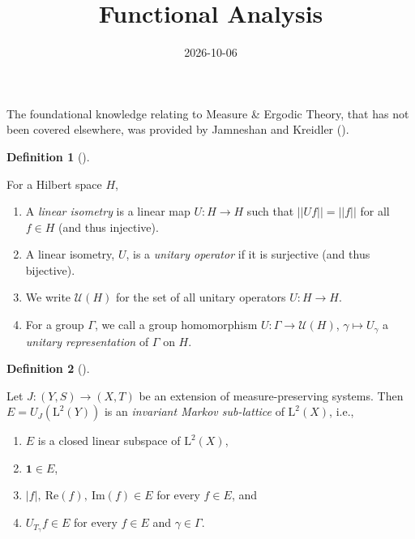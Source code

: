 \documentclass[
  british,
]{article}
\title{Functional Analysis}
\author{}
\date{2026-10-06}
\providecommand{\tightlist}{%
  \setlength{\itemsep}{0pt}\setlength{\parskip}{0pt}}
\theoremstyle{definition}
\theoremstyle{definition}
\newtheorem{definition}{Definition}[section]
\theoremstyle{plain}
\theoremstyle{remark}
\newcommand{\Group}{{\Gamma}}
\newcommand{\GroupElement}{{\gamma}}
\newcommand{\HilbertSpace}{{H}}
\begin{document}
\maketitle


The foundational knowledge relating to Measure \& Ergodic Theory, that
has not been covered elsewhere, was provided by Jamneshan and Kreidler
().

\begin{definition}[]\protect\hypertarget{def-Representation}{}\label{def-Representation}

For a Hilbert space \(\HilbertSpace\),

\begin{enumerate}
\def\labelenumi{\arabic{enumi}.}
\tightlist
\item
  A \emph{linear isometry} is a linear map
  \(U:\HilbertSpace \rightarrow \HilbertSpace\) such that
  \(||Uf||=||f||\) for all \(f\in \HilbertSpace\) (and thus injective).
\item
  A linear isometry, \(U\), is a \emph{unitary operator} if it is
  surjective (and thus bijective).
\item
  We write \(\mathscr{U}(\HilbertSpace)\) for the set of all unitary
  operators \(U:\HilbertSpace \rightarrow \HilbertSpace\).
\item
  For a group \(\Group\), we call a group homomorphism
  \(U:\Group\rightarrow\mathscr{U}(\HilbertSpace )\),
  \(\GroupElement\mapsto U_\GroupElement\) a \emph{unitary
  representation} of \(\Group\) on \(\HilbertSpace\).
\end{enumerate}

\end{definition}

\begin{definition}[]\protect\hypertarget{def-MarkovSubLattive}{}\label{def-MarkovSubLattive}

Let \(J:(Y,S)\rightarrow(X,T)\) be an extension of measure-preserving
systems. Then \(E=U_J(\text{L}^2(Y))\) is an \emph{invariant Markov
sub-lattice} of \(\text{L}^2(X)\), i.e.,

\begin{enumerate}
\def\labelenumi{\arabic{enumi}.}
\tightlist
\item
  \(E\) is a closed linear subspace of \(\text{L}^2(X)\),
\item
  \(\boldsymbol{1}\in E\),
\item
  \(|f|,\ \text{Re}(f),\ \text{Im}(f)\in E\) for every \(f\in E\), and
\item
  \(U_{T_\GroupElement}f\in E\) for every \(f\in E\) and
  \(\GroupElement\in\Group\).
\end{enumerate}

\end{definition}
\end{document}
